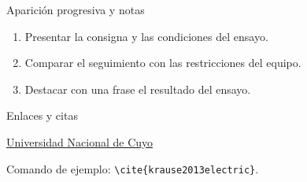 \documentclass{beamer}
\newif\ifreferencias
\begin{document}
\begin{frame}[label=ejemplo-exposicion]{Aparición progresiva y notas}
  \begin{enumerate}[<+->]
    \item Presentar la consigna y las condiciones del ensayo.
    \item Comparar el seguimiento con las restricciones del equipo.
    \item Destacar con \alert{una frase} el resultado del ensayo.
  \end{enumerate}
\end{frame}

\begin{frame}{Enlaces y citas}
  \hyperlink{ejemplo-exposicion}{}

  \medskip
  \href{https://www.uncuyo.edu.ar/}{Universidad Nacional de Cuyo}

  \medskip
  \ifreferencias
    Transformación de Park y modelado de máquinas eléctricas~\cite{krause2013electric}.
  \else
    Comando de ejemplo: \texttt{\textbackslash cite\{krause2013electric\}}.
  \fi
\end{frame}
\fi
\end{document}
